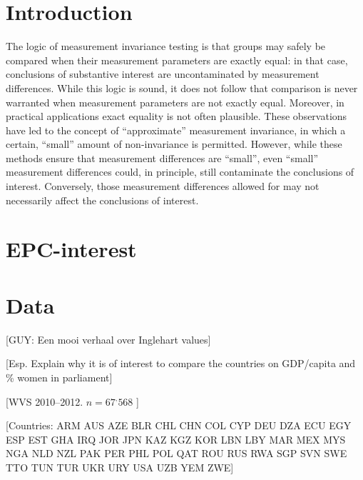 \documentclass[letterpaper,12pt]{article}
\begin{document}
\section{Introduction}

\noindent

The logic of measurement invariance testing is that groups may safely be compared when their measurement parameters are exactly equal: in that case, conclusions of substantive interest are uncontaminated by measurement differences. While this logic is sound, it does not follow that comparison is never warranted when measurement parameters are not exactly equal. Moreover, in practical applications exact equality is not often plausible. These observations have led to the concept of ``approximate'' measurement  invariance, in which a certain, ``small'' amount of non-invariance is permitted. 
However, while these methods ensure that measurement differences are ``small'', even ``small'' measurement differences could, in principle, still contaminate the conclusions of interest. Conversely, those measurement differences allowed for may not necessarily affect the conclusions of interest. 


\citep{muthen2012bayesian}
\citep{schoot2013facing}

\citep{muthen2014alignment}


\section{EPC-interest}



\section{Data}

[GUY: Een mooi verhaal over Inglehart values]

[Esp. Explain why it is of interest to compare the countries on GDP/capita and \% women in parliament]

[WVS 2010--2012. $n=67^,568$ ]

[Countries: ARM AUS AZE BLR CHL CHN COL CYP DEU DZA ECU EGY ESP EST GHA IRQ JOR JPN KAZ KGZ KOR LBN LBY MAR MEX MYS NGA NLD NZL PAK PER PHL POL QAT ROU RUS RWA SGP SVN SWE TTO TUN TUR UKR URY USA UZB YEM ZWE]
\end{document}
